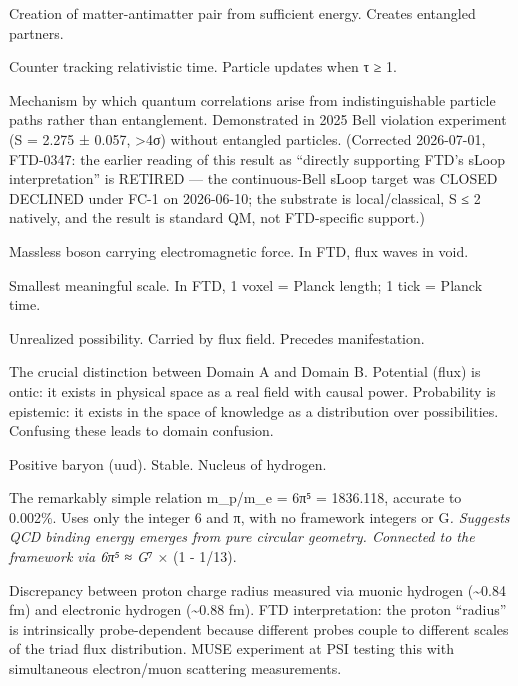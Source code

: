 \documentclass[
  11pt,
  letterpaper,
  twoside,
  openright]{book}
\providecommand{\tightlist}{%
  \setlength{\itemsep}{0pt}\setlength{\parskip}{0pt}}
\begin{document}
\begin{description}
\tightlist
\item[\textbf{Pair Production}]
Creation of matter-antimatter pair from sufficient energy. Creates
entangled partners.
\item[\textbf{Phase Accumulator (τ)}]
Counter tracking relativistic time. Particle updates when τ ≥ 1.
\item[\textbf{Path Identity (Quantum Indistinguishability)}]
Mechanism by which quantum correlations arise from indistinguishable
particle paths rather than entanglement. Demonstrated in 2025 Bell
violation experiment (S = 2.275 ± 0.057, \textgreater4σ) without
entangled particles. (Corrected 2026-07-01, FTD-0347: the earlier
reading of this result as ``directly supporting FTD's sLoop
interpretation'' is RETIRED --- the continuous-Bell sLoop target was
CLOSED DECLINED under FC-1 on 2026-06-10; the substrate is
local/classical, S ≤ 2 natively, and the result is standard QM, not
FTD-specific support.)
\item[\textbf{Photon}]
Massless boson carrying electromagnetic force. In FTD, flux waves in
void.
\item[\textbf{Planck Scale}]
Smallest meaningful scale. In FTD, 1 voxel = Planck length; 1 tick =
Planck time.
\item[\textbf{Potential}]
Unrealized possibility. Carried by flux field. Precedes manifestation.
\item[\textbf{Potential vs Probability}]
The crucial distinction between Domain A and Domain B. Potential (flux)
is ontic: it exists in physical space as a real field with causal power.
Probability is epistemic: it exists in the space of knowledge as a
distribution over possibilities. Confusing these leads to domain
confusion.
\item[\textbf{Proton}]
Positive baryon (uud). Stable. Nucleus of hydrogen.
\item[\textbf{Proton Mass (π Formula)}]
The remarkably simple relation m\_p/m\_e = 6π⁵ = 1836.118, accurate to
0.002\%. Uses only the integer 6 and π, with no framework integers or
G\emph{. Suggests QCD binding energy emerges from pure circular
geometry. Connected to the framework via 6π⁵ ≈ G}⁷ × (1 - 1/13).
\item[\textbf{Proton Radius Puzzle}]
Discrepancy between proton charge radius measured via muonic hydrogen
(\textasciitilde0.84 fm) and electronic hydrogen (\textasciitilde0.88
fm). FTD interpretation: the proton ``radius'' is intrinsically
probe-dependent because different probes couple to different scales of
the triad flux distribution. MUSE experiment at PSI testing this with
simultaneous electron/muon scattering measurements.
\end{description}
\end{document}
